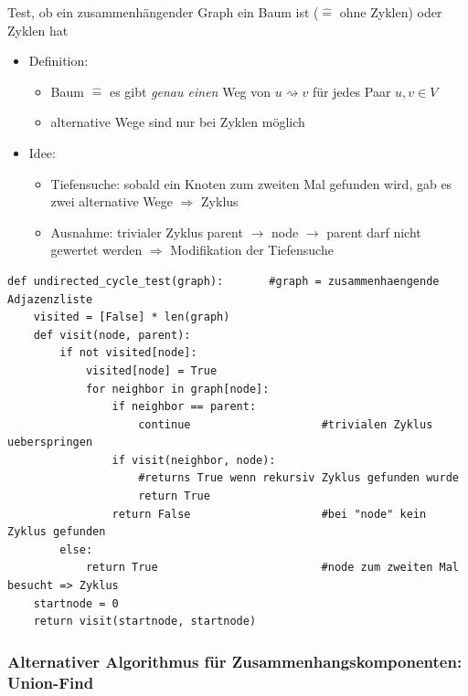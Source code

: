             Test, ob ein zusammenhängender Graph ein Baum ist ($\widehat{=}$ ohne Zyklen) oder Zyklen hat
            \begin{itemize}
            \item Definition:
            \begin{itemize}
            \item Baum $\widehat{=}$ es gibt \emph{genau einen} Weg von $u \rightsquigarrow v$ für jedes Paar $u, v \in V$
            \item alternative Wege sind nur bei Zyklen möglich
            \end{itemize}
            \item Idee:
            \begin{itemize}
            \item Tiefensuche: sobald ein Knoten zum zweiten Mal gefunden wird, gab es zwei alternative Wege $\Rightarrow$ Zyklus
            \item Ausnahme: trivialer Zyklus parent $\rightarrow$ node $\rightarrow$ parent darf nicht gewertet werden $\Rightarrow$ Modifikation der Tiefensuche
            \end{itemize}
            \end{itemize}

            \begin{verbatim}
def undirected_cycle_test(graph):       #graph = zusammenhaengende Adjazenzliste
    visited = [False] * len(graph)
    def visit(node, parent):
        if not visited[node]:
            visited[node] = True
            for neighbor in graph[node]:
                if neighbor == parent:
                    continue                    #trivialen Zyklus ueberspringen
                if visit(neighbor, node):
                    #returns True wenn rekursiv Zyklus gefunden wurde
                    return True
                return False                    #bei "node" kein Zyklus gefunden
        else:
            return True                         #node zum zweiten Mal besucht => Zyklus
    startnode = 0
    return visit(startnode, startnode)
            \end{verbatim}

        \subsubsection*{Alternativer Algorithmus für Zusammenhangskomponenten: Union-Find}

